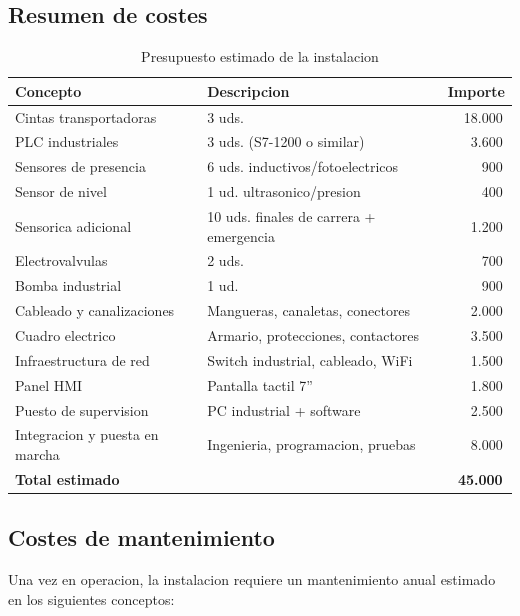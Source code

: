 \subsection{Resumen de costes}

\begin{table}[H]
\centering
\small
\caption{Presupuesto estimado de la instalacion}
\label{tab:presupuesto}
\begin{tabularx}{\textwidth}{@{}lXr@{}}
\toprule
\textbf{Concepto} & \textbf{Descripcion} & \textbf{Importe} \\
\midrule
Cintas transportadoras & 3 uds. & 18.000\,\texteuro{} \\
PLC industriales & 3 uds. (S7-1200 o similar) & 3.600\,\texteuro{} \\
Sensores de presencia & 6 uds. inductivos/fotoelectricos & 900\,\texteuro{} \\
Sensor de nivel & 1 ud. ultrasonico/presion & 400\,\texteuro{} \\
Sensorica adicional & 10 uds. finales de carrera + emergencia & 1.200\,\texteuro{} \\
Electrovalvulas & 2 uds. & 700\,\texteuro{} \\
Bomba industrial & 1 ud. & 900\,\texteuro{} \\
Cableado y canalizaciones & Mangueras, canaletas, conectores & 2.000\,\texteuro{} \\
Cuadro electrico & Armario, protecciones, contactores & 3.500\,\texteuro{} \\
Infraestructura de red & Switch industrial, cableado, WiFi & 1.500\,\texteuro{} \\
Panel HMI & Pantalla tactil 7'' & 1.800\,\texteuro{} \\
Puesto de supervision & PC industrial + software & 2.500\,\texteuro{} \\
Integracion y puesta en marcha & Ingenieria, programacion, pruebas & 8.000\,\texteuro{} \\
\midrule
\textbf{Total estimado} & & \textbf{45.000\,\texteuro{}} \\
\bottomrule
\end{tabularx}
\end{table}

\subsection{Costes de mantenimiento}

Una vez en operacion, la instalacion requiere un mantenimiento anual estimado en los siguientes conceptos:

